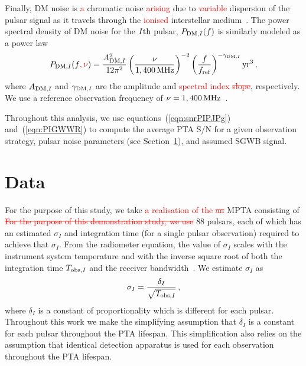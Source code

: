 \documentclass[fleqn,usenatbib]{mnras}
\newcommand{\fref}{f_{\rm ref}}
\newcommand{\ADMI}{A_{{\rm DM},I}}
\newcommand{\gammaDMI}{\gamma_{{\rm DM},I}}
\newcommand{\PdmI}{P_{{\rm DM},I}}
\newcommand{\NMeerTimePSRs}{88}
\newcommand{\change}{\textcolor{red}}
\begin{document}
Finally, DM noise is \change{a} chromatic noise \change{arising} due to \change{variable} dispersion of the pulsar signal as it travels through the \change{ionised} interstellar medium~\cite[e.g.][]{Cordes:2002}. 
The power spectral density of DM noise for the $I{\rm th}$ pulsar, $\PdmI (f)$ is similarly modeled as a power law~\cite[see, e.g.,][]{PPTAGWReardonEtAl:2023}
\begin{equation}
\PdmI (f\change{,\nu}) = \frac{\ADMI^2}{12 \pi^2} 
            \left(\frac{\nu}{1,400\,{\rm MHz}}\right)^{-2}
            \left( \frac{f}{\fref} \right)^{-\gammaDMI} 
            {\rm yr}^3\,,
\end{equation}
where $\ADMI$ and $\gammaDMI$ are the amplitude and \change{spectral index \st{slope}}, respectively.
We use a reference observation frequency of $\nu=1,400\,{\rm MHz}$~\cite[as in][as the L-band receiver is used for MPTA analysis]{MPTANoiseMilesEtAl:2025}. 


Throughout this analysis, we use equations~(\ref{eqn:snrPIPJPg}) and~(\ref{eqn:PIGWWR}) to compute the average PTA S/N for a given observation strategy, pulsar noise parameters (see Section~\ref{sec:data}), and assumed SGWB signal.


\section{Data}
\label{sec:data}
For the purpose of this study, we take \change{a realisation of the \st{an}} MPTA consisting of \change{\st{For the purpose of this demonstration study, we use}} $\NMeerTimePSRs$ pulsars, each of which has an estimated $\sigma_I$ and integration time (for a single pulsar observation) required to achieve that $\sigma_I$.
From the radiometer equation, the value of $\sigma_I$ scales with the instrument system temperature and with the inverse square root of both the integration time $T_{{\rm obs},I}$ and the receiver bandwidth~\citep[see, for example][]{LorimerKramer:2012, HandzoEtAl:2015}. 
We estimate $\sigma_I$ as
\begin{equation}
\sigma_I = \frac{\delta_I}{\sqrt{T_{{\rm obs},I}}}\,,
\label{eqn:TobsToSig}
\end{equation}
where $\delta_I$ is a constant of proportionality which is different for each pulsar. 
Throughout this work we make the simplifying assumption that $\delta_I$ is a constant for each pulsar throughout the PTA lifespan.
This simplification also relies on the assumption that identical detection apparatus is used for each observation throughout the PTA lifespan. 
\end{document}
